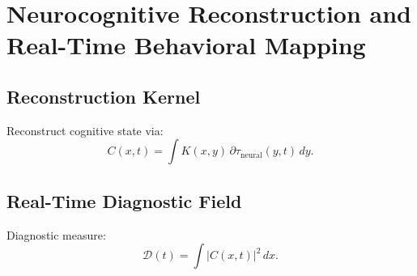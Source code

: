 \chapter{Neurocognitive Reconstruction and Real-Time Behavioral Mapping}

\section{Reconstruction Kernel}
Reconstruct cognitive state via:
\[
C(x,t) = \int K(x,y)\,\partial\tau_{\mathrm{neural}}(y,t)\, dy.
\]

\section{Real-Time Diagnostic Field}
Diagnostic measure:
\[
\mathcal{D}(t) = \int |C(x,t)|^2\, dx.
\]
